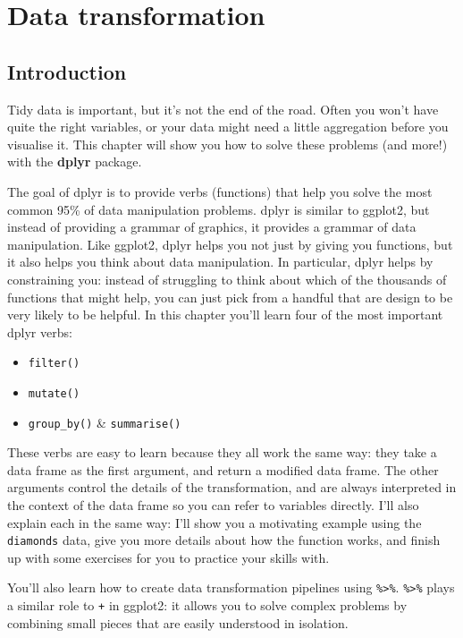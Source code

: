 \chapter{Data transformation}\label{cha:dplyr}

\section{Introduction}\label{introduction}

Tidy data is important, but it's not the end of the road. Often you
won't have quite the right variables, or your data might need a little
aggregation before you visualise it. This chapter will show you how to
solve these problems (and more!) with the \textbf{dplyr} package.
 

The goal of dplyr is to provide verbs (functions) that help you solve
the most common 95\% of data manipulation problems. dplyr is similar to
ggplot2, but instead of providing a grammar of graphics, it provides a
grammar of data manipulation. Like ggplot2, dplyr helps you not just by
giving you functions, but it also helps you think about data
manipulation. In particular, dplyr helps by constraining you: instead of
struggling to think about which of the thousands of functions that might
help, you can just pick from a handful that are design to be very likely
to be helpful. In this chapter you'll learn four of the most important
dplyr verbs:

\begin{itemize}
\tightlist
\item
  \texttt{filter()}
\item
  \texttt{mutate()}
\item
  \texttt{group\_by()} \& \texttt{summarise()}
\end{itemize}

These verbs are easy to learn because they all work the same way: they
take a data frame as the first argument, and return a modified data
frame. The other arguments control the details of the transformation,
and are always interpreted in the context of the data frame so you can
refer to variables directly. I'll also explain each in the same way:
I'll show you a motivating example using the \texttt{diamonds} data,
give you more details about how the function works, and finish up with
some exercises for you to practice your skills with.

You'll also learn how to create data transformation pipelines using
\texttt{\%\textgreater{}\%}. \texttt{\%\textgreater{}\%} plays a similar
role to \texttt{+} in ggplot2: it allows you to solve complex problems
by combining small pieces that are easily understood in isolation.

